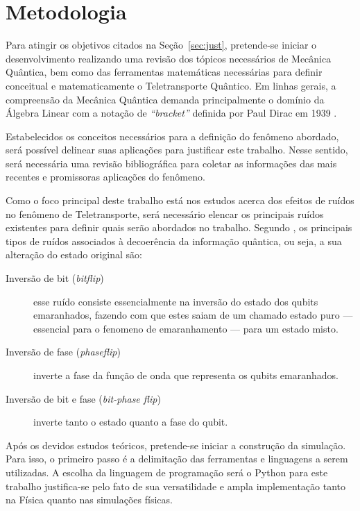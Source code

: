 \documentclass[12pt,oneside,brazil,hidelinks,article,sumario=tradicional,a4paper]{abntex2}
\begin{document}
\section{Metodologia}

Para atingir os objetivos citados na Seção~\ref{sec:just}, pretende-se iniciar o desenvolvimento realizando uma revisão dos tópicos necessários de Mecânica Quântica, bem como das ferramentas matemáticas necessárias para definir conceitual e matematicamente o Teletransporte Quântico. Em linhas gerais, a compreensão da Mecânica Quântica demanda principalmente o domínio da Álgebra Linear com a notação de \textit{``bracket''} definida por Paul Dirac em 1939 \cite{DIRAC}.

Estabelecidos os conceitos necessários para a definição do fenômeno abordado, será possível delinear suas aplicações para justificar este trabalho. Nesse sentido, será necessária uma revisão bibliográfica para coletar as informações das mais recentes e promissoras aplicações do fenômeno.

Como o foco principal deste trabalho está nos estudos acerca dos efeitos de ruídos no fenômeno de Teletransporte, será necessário elencar os principais ruídos existentes para definir quais serão abordados no trabalho. Segundo \cite{teseufscar}, os principais tipos de ruídos associados à decoerência da informação quântica, ou seja, a sua alteração do estado original são:

\begin{description}
  \item [Inversão de bit (\textit{bitflip})] esse ruído consiste essencialmente na inversão do estado dos qubits emaranhados, fazendo com que estes saiam de um chamado estado puro --- essencial para o fenomeno de emaranhamento --- para um estado misto.
  \item [Inversão de fase (\textit{phaseflip})] inverte a fase da função de onda que representa os qubits emaranhados.
  \item [Inversão de bit e fase (\textit{bit-phase flip})] inverte tanto o estado quanto a fase do qubit.
\end{description}

Após os devidos estudos teóricos, pretende-se iniciar a construção da simulação. Para isso, o primeiro passo é a delimitação das ferramentas e linguagens a serem utilizadas. A escolha da linguagem de programação será o Python para este trabalho justifica-se pelo fato de sua versatilidade e ampla implementação tanto na Física quanto nas simulações físicas.
\end{document}
